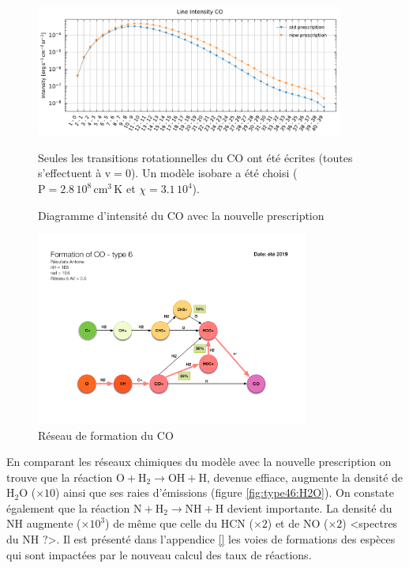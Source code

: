 \begin{figure}[!h]
    \centering \includegraphics[trim = {0 0 0 1cm},clip,width=0.9\textwidth]{figure/type46/I_comp_CO.pdf}
    \caption{Diagramme d'intensité du $\mathrm{CO}$ avec la nouvelle prescription}
    \begin{minipage}{\textwidth}
    Seules les transitions rotationnelles du $\mathrm{CO}$ ont été écrites (toutes s'effectuent à $\mathrm{v}=0$). Un modèle isobare a été choisi ($\mathrm{P} = 2.8\,10^{8} \,\mathrm{cm}^3\,\mathrm{K}$ et $\chi = 3.1\, 10^4$).
    \end{minipage}
    \label{fig:type46:CO}
\end{figure}

\begin{figure}[!h]
    \centering \includegraphics[trim = {3cm 3cm 3cm 7cm},clip,width=0.8\textwidth]{figure/type46/ChimieCO_2.pdf}
    \caption{Réseau de formation du $\mathrm{CO}$}
    \begin{minipage}{\textwidth}
    
    \end{minipage}
    \label{fig:type46:form:CO}
\end{figure}

En comparant les réseaux chimiques du modèle avec la nouvelle prescription on trouve que la réaction $\mathrm{O} + \mathrm{H}_2 \rightarrow \mathrm{OH} +  \mathrm{H}$, devenue effiace, augmente la densité de $\mathrm{H}_2\mathrm{O}$ ($\times 10$) ainsi que ses raies d'émissions (figure \ref{fig:type46:H2O}). On constate également que la réaction $\mathrm{N} + \mathrm{H}_2 \rightarrow  \mathrm{NH} +  \mathrm{H}$ devient importante. La densité du $\mathrm{NH}$ augmente ($\times 10^3$) de même que celle du $\mathrm{HCN}$ ($\times 2$) et de $\mathrm{NO}$ ($\times 2$) <spectres du $\mathrm{NH}$ ?>. Il est présenté dans l'appendice \ref{} les voies de formations des espèces qui sont impactées par le nouveau calcul des taux de réactions.\newline 

